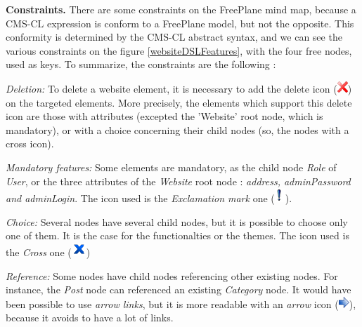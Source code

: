 						\vspace{0.15em}
						\noindent\textbf{Constraints.} There are some constraints on the FreePlane mind map, because a CMS-CL expression 
						is conform to a FreePlane model,
						but not the opposite. This conformity is determined by the CMS-CL abstract syntax, and we can see the various
						constraints on the figure \ref{websiteDSLFeatures}, with the four free nodes, used as keys. To summarize, the 									constraints are the following :
						
						\vspace{0.15em}
						\noindent\textit{Deletion:} To delete a website element, it is necessary to add the delete icon
											(\includegraphics[scale=0.50]{../resources/png/delete.png}) on the targeted elements. More precisely, the elements which support this delete icon are those with attributes (excepted the 'Website' root node, which is mandatory), or 		with a choice concerning their child nodes (so, the nodes with a cross icon).
							
						\vspace{0.15em}
						\noindent\textit{Mandatory features:} Some elements are mandatory, as the child node \textit{Role} of \textit{User}, or the three 												attributes of the \textit{Website} root node : \textit{address, adminPassword and adminLogin}. The icon used is the 													\textit{Exclamation mark} one (\includegraphics[scale=0.50]{../resources/png/exclamationMark.png}).
						
						\vspace{0.15em}
						\noindent\textit{Choice:} Several nodes have several child nodes, but it is possible to choose only one of them. It is the case for the 
									functionalties or the themes. The icon used is the \textit{Cross} one (\includegraphics[scale=0.50]{../resources/png/cross.png})
								
						\vspace{0.15em}
						\noindent\textit{Reference:} Some nodes have child nodes referencing other existing nodes. For instance, the \textit{Post} node can 											referenced an existing \textit{Category} node. It would have been possible to use \textit{arrow links}, but it is more readable 										with an \textit{arrow} icon (\includegraphics[scale=0.50]{../resources/png/arrow.png}), because it avoids to have a lot of links.